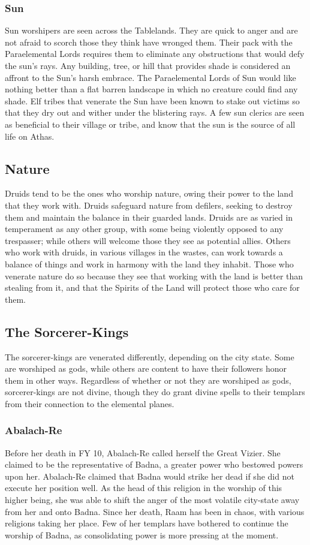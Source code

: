 \subsubsection{Sun}
Sun worshipers are seen across the Tablelands. They are quick to anger and are not afraid to scorch those they think have wronged them. Their pack with the Paraelemental Lords requires them to eliminate any obstructions that would defy the sun's rays. Any building, tree, or hill that provides shade is considered an affront to the Sun's harsh embrace. The Paraelemental Lords of Sun would like nothing better than a flat barren landscape in which no creature could find any shade. Elf tribes that venerate the Sun have been known to stake out victims so that they dry out and wither under the blistering rays. A few sun clerics are seen as beneficial to their village or tribe, and know that the sun is the source of all life on Athas.

\subsection{Nature}
Druids tend to be the ones who worship nature, owing their power to the land that they work with. Druids safeguard nature from defilers, seeking to destroy them and maintain the balance in their guarded lands. Druids are as varied in temperament as any other group, with some being violently opposed to any trespasser; while others will welcome those they see as potential allies. Others who work with druids, in various villages in the wastes, can work towards a balance of things and work in harmony with the land they inhabit. Those who venerate nature do so because they see that working with the land is better than stealing from it, and that the Spirits of the Land will protect those who care for them.

\subsection{The Sorcerer-Kings}
The sorcerer-kings are venerated differently, depending on the city state. Some are worshiped as gods, while others are content to have their followers honor them in other ways. Regardless of whether or not they are worshiped as gods, sorcerer-kings are not divine, though they do grant divine spells to their templars from their connection to the elemental planes.

\subsubsection{Abalach-Re}
Before her death in FY 10, Abalach-Re called herself the Great Vizier. She claimed to be the representative of Badna, a greater power who bestowed powers upon her. Abalach-Re claimed that Badna would strike her dead if she did not execute her position well. As the head of this religion in the worship of this higher being, she was able to shift the anger of the most volatile city-state away from her and onto Badna. Since her death, Raam has been in chaos, with various religions taking her place. Few of her templars have bothered to continue the worship of Badna, as consolidating power is more pressing at the moment.

